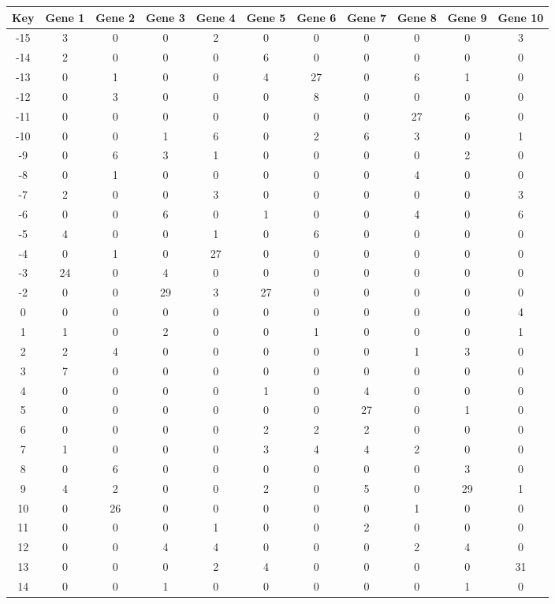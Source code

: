 \begin{tabular}{|c|c|c|c|c|c|c|c|c|c|c|}
\hline
Key & Gene 1 & Gene 2 & Gene 3 & Gene 4 & Gene 5 & Gene 6 & Gene 7 & Gene 8 & Gene 9 & Gene 10 \\
\hline
-15 & 3 & 0 & 0 & 2 & 0 & 0 & 0 & 0 & 0 & 3 \\
-14 & 2 & 0 & 0 & 0 & 6 & 0 & 0 & 0 & 0 & 0 \\
-13 & 0 & 1 & 0 & 0 & 4 & 27 & 0 & 6 & 1 & 0 \\
-12 & 0 & 3 & 0 & 0 & 0 & 8 & 0 & 0 & 0 & 0 \\
-11 & 0 & 0 & 0 & 0 & 0 & 0 & 0 & 27 & 6 & 0 \\
-10 & 0 & 0 & 1 & 6 & 0 & 2 & 6 & 3 & 0 & 1 \\
-9 & 0 & 6 & 3 & 1 & 0 & 0 & 0 & 0 & 2 & 0 \\
-8 & 0 & 1 & 0 & 0 & 0 & 0 & 0 & 4 & 0 & 0 \\
-7 & 2 & 0 & 0 & 3 & 0 & 0 & 0 & 0 & 0 & 3 \\
-6 & 0 & 0 & 6 & 0 & 1 & 0 & 0 & 4 & 0 & 6 \\
-5 & 4 & 0 & 0 & 1 & 0 & 6 & 0 & 0 & 0 & 0 \\
-4 & 0 & 1 & 0 & 27 & 0 & 0 & 0 & 0 & 0 & 0 \\
-3 & 24 & 0 & 4 & 0 & 0 & 0 & 0 & 0 & 0 & 0 \\
-2 & 0 & 0 & 29 & 3 & 27 & 0 & 0 & 0 & 0 & 0 \\
0 & 0 & 0 & 0 & 0 & 0 & 0 & 0 & 0 & 0 & 4 \\
1 & 1 & 0 & 2 & 0 & 0 & 1 & 0 & 0 & 0 & 1 \\
2 & 2 & 4 & 0 & 0 & 0 & 0 & 0 & 1 & 3 & 0 \\
3 & 7 & 0 & 0 & 0 & 0 & 0 & 0 & 0 & 0 & 0 \\
4 & 0 & 0 & 0 & 0 & 1 & 0 & 4 & 0 & 0 & 0 \\
5 & 0 & 0 & 0 & 0 & 0 & 0 & 27 & 0 & 1 & 0 \\
6 & 0 & 0 & 0 & 0 & 2 & 2 & 2 & 0 & 0 & 0 \\
7 & 1 & 0 & 0 & 0 & 3 & 4 & 4 & 2 & 0 & 0 \\
8 & 0 & 6 & 0 & 0 & 0 & 0 & 0 & 0 & 3 & 0 \\
9 & 4 & 2 & 0 & 0 & 2 & 0 & 5 & 0 & 29 & 1 \\
10 & 0 & 26 & 0 & 0 & 0 & 0 & 0 & 1 & 0 & 0 \\
11 & 0 & 0 & 0 & 1 & 0 & 0 & 2 & 0 & 0 & 0 \\
12 & 0 & 0 & 4 & 4 & 0 & 0 & 0 & 2 & 4 & 0 \\
13 & 0 & 0 & 0 & 2 & 4 & 0 & 0 & 0 & 0 & 31 \\
14 & 0 & 0 & 1 & 0 & 0 & 0 & 0 & 0 & 1 & 0 \\
\hline
\end{tabular}